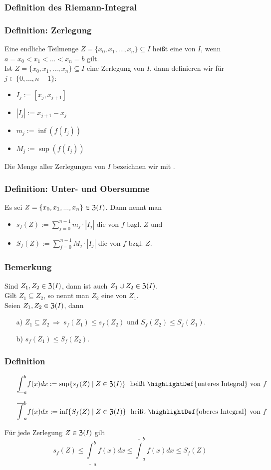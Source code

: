 \subsubsection{Definition des Riemann-Integral}
%
\begin{frame}\frametitle{Definition: Zerlegung}
Eine endliche Teilmenge $Z=\{x_0,x_1,...,x_n\}\subseteq I$ heißt eine  von $I$, wenn $a=x_0<x_1<...<x_n=b$ gilt.\\\pause
\vfill
Ist $Z=\{x_0,x_1,...,x_n\}\subseteq I$ eine Zerlegung von $I$, dann definieren wir für $j\in \{0,...,n-1\}$:
\begin{itemize}
\item $I_j:=[x_j,x_{j+1}]$
\item $|I_j|:=x_{j+1}-x_j$
\item $m_j:=\inf(f(I_j))$
\item $M_j:=\sup(f(I_j))$
\end{itemize}\vfill
Die Menge aller Zerlegungen von $I$ bezeichnen wir mit .
\end{frame}
%
\begin{frame}\frametitle{Definition: Unter- und Obersumme}
Es sei $Z=\{x_0,x_1,...,x_n\} \in \frak{Z}(I)$. Dann nennt man
\begin{itemize}
\item $s_f(Z):=\sum_{j=0}^{n-1} m_j\cdot |I_j|$ die  von $f$ bzgl. $Z$ und 
\item $S_f(Z):=\sum_{j=0}^{n-1} M_j\cdot |I_j|$ die  von $f$ bzgl. $Z$.
\end{itemize}

\end{frame}
%
\begin{frame}\frametitle{Bemerkung}
Sind $Z_1,Z_2 \in \frak{Z}(I)$, dann ist auch $Z_1\cup Z_2 \in \frak{Z}(I)$.\\
\vfill
Gilt $Z_1 \subseteq Z_2$, so nennt man $Z_2$ eine  von $Z_1$.
\vfill
\pause
{}\\
Seien $Z_1,Z_2 \in \frak{Z}(I)$, dann
\begin{itemize}
\item[a)] $Z_1 \subseteq Z_2 \ \Longrightarrow \ s_f(Z_1)\le s_f(Z_2)$ und $S_f(Z_2)\le S_f(Z_1)$. 
\item[b)] $s_f(Z_1) \le S_f(Z_2)$.
\end{itemize}
\end{frame}
%
\begin{frame}\frametitle{Definition}
\begin{itemize}
\item[]
$$
\underline{\int}_{a}^b f(x)dx:=\sup\{s_f(Z) \mid Z \in \frak{Z}(I)\} \ \text{ heißt \highlightDef{unteres Integral} von }f
$$
\vfill
\item[]
$$
\overline{\int}_a^{b} f(x)dx:=\inf\{S_f(Z) \mid Z \in \frak{Z}(I)\} \ \text{ heißt \highlightDef{oberes Integral} von }f
$$
\end{itemize}
\vfill
\pause
Für jede Zerlegung $Z\in \frak{Z}(I)$ gilt
$$
s_f(Z)\le \underline{\int}_{a}^b f(x)dx\le \overline{\int}_a^{b} f(x)dx\le S_f(Z)
$$
\end{frame}
